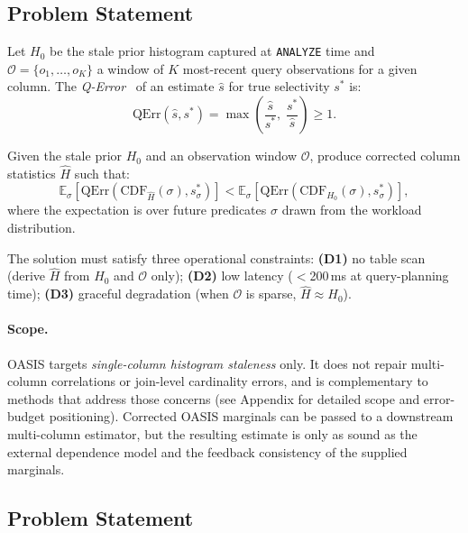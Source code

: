 \documentclass[runningheads]{llncs}
\begin{document}
\subsection{Problem Statement}

Let $H_0$ be the stale prior histogram captured at \texttt{ANALYZE} time and
$\mathcal{O} = \{o_1, \ldots, o_K\}$ a window of $K$ most-recent query
observations for a given column.
The \emph{Q-Error}~\cite{moerkotte2009preventing} of an estimate $\hat{s}$
for true selectivity $s^*$ is:
\begin{equation}
  \mathrm{QErr}(\hat{s}, s^*) = \max\!\left(\frac{\hat{s}}{s^*},\;
                                              \frac{s^*}{\hat{s}}\right) \geq 1.
  \label{eq:qerr}
\end{equation}

\begin{problem}
Given the stale prior $H_0$ and an observation window $\mathcal{O}$,
produce corrected column statistics $\hat{H}$ such that:
\[
  \mathbb{E}_\sigma\!\left[\mathrm{QErr}\!\left(
      \mathrm{CDF}_{\hat{H}}(\sigma), s^*_\sigma\right)\right]
  < \mathbb{E}_\sigma\!\left[\mathrm{QErr}\!\left(
      \mathrm{CDF}_{H_0}(\sigma), s^*_\sigma\right)\right],
\]
where the expectation is over future predicates $\sigma$ drawn from the
workload distribution.
\end{problem}

The solution must satisfy three operational constraints:
\textbf{(D1)} no table scan (derive $\hat{H}$ from $H_0$ and $\mathcal{O}$ only);
\textbf{(D2)} low latency ($<$200\,ms at query-planning time);
\textbf{(D3)} graceful degradation (when $\mathcal{O}$ is sparse, $\hat{H} \approx H_0$).

\paragraph{Scope.}
OASIS targets \emph{single-column histogram staleness} only. It does not repair multi-column correlations or join-level cardinality errors, and is complementary to methods that address those concerns (see Appendix for detailed scope and error-budget positioning). Corrected OASIS marginals can be passed to a downstream multi-column estimator, but the resulting estimate is only as sound as the external dependence model and the feedback consistency of the supplied marginals.

\subsection{Problem Statement}
\end{document}
